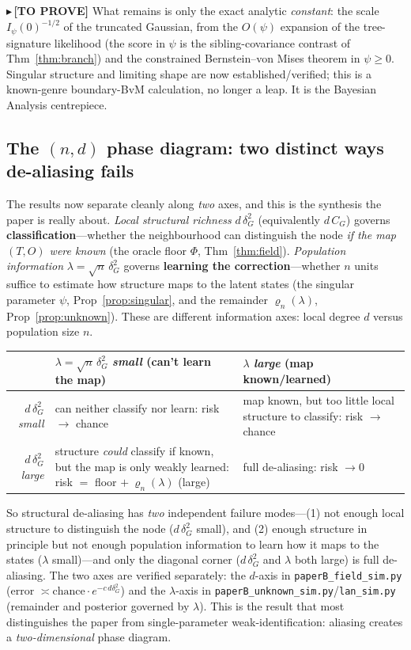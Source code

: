 \documentclass[11pt]{article}
\newcommand{\CONJ}[1]{{\color{violet}\small$\blacktriangleright$\,\textbf{[TO PROVE]} #1}}
\begin{document}
\CONJ{What remains is only the exact analytic \emph{constant}: the scale $I_\psi(0)^{-1/2}$ of the truncated
Gaussian, from the $O(\psi)$ expansion of the tree-signature likelihood (the score in $\psi$ is the
sibling-covariance contrast of Thm~\ref{thm:branch}) and the constrained Bernstein--von Mises theorem in
$\psi\ge0$. Singular structure and limiting shape are now established/verified; this is a known-genre boundary-BvM
calculation, no longer a leap. It is the Bayesian Analysis centrepiece.}

\subsection{The $(n,d)$ phase diagram: two distinct ways de-aliasing fails}\label{sec:phase}
The results now separate cleanly along \emph{two} axes, and this is the synthesis the paper is really about.
\emph{Local structural richness} $d\,\delta_G^2$ (equivalently $d\,C_G$) governs \textbf{classification}---whether
the neighbourhood can distinguish the node \emph{if the map $(T,O)$ were known} (the oracle floor
$\Phi$, Thm~\ref{thm:field}). \emph{Population information} $\lambda=\sqrt n\,\delta_G^2$ governs
\textbf{learning the correction}---whether $n$ units suffice to estimate how structure maps to the latent states
(the singular parameter $\psi$, Prop~\ref{prop:singular}, and the remainder $\varrho_n(\lambda)$,
Prop~\ref{prop:unknown}). These are different information axes: local degree $d$ versus population size $n$.
\begin{center}\small
\begin{tabular}{r|p{5.4cm}|p{5.4cm}}
 & $\lambda=\sqrt n\,\delta_G^2$ \emph{small} (can't learn the map) & $\lambda$ \emph{large} (map known/learned) \\ \hline
$d\,\delta_G^2$ \emph{small} & can neither classify nor learn: risk $\to$ chance & map known, but too little local structure to classify: risk $\to$ chance \\ \hline
$d\,\delta_G^2$ \emph{large} & structure \emph{could} classify if known, but the map is only weakly learned: risk $=$ floor $+\ \varrho_n(\lambda)$ (large) & full de-aliasing: risk $\to0$ \\
\end{tabular}
\end{center}
So structural de-aliasing has \emph{two} independent failure modes---(1) not enough local structure to
distinguish the node ($d\,\delta_G^2$ small), and (2) enough structure in principle but not enough population
information to learn how it maps to the states ($\lambda$ small)---and only the diagonal corner
($d\,\delta_G^2$ and $\lambda$ both large) is full de-aliasing. The two axes are verified separately: the $d$-axis
in \texttt{paperB\_field\_sim.py} (error $\asymp\text{chance}\cdot e^{-c\,d\delta_G^2}$) and the $\lambda$-axis in
\texttt{paperB\_unknown\_sim.py}/\texttt{lan\_sim.py} (remainder and posterior governed by $\lambda$). This is the
result that most distinguishes the paper from single-parameter weak-identification: aliasing creates a
\emph{two-dimensional} phase diagram.
\end{document}
